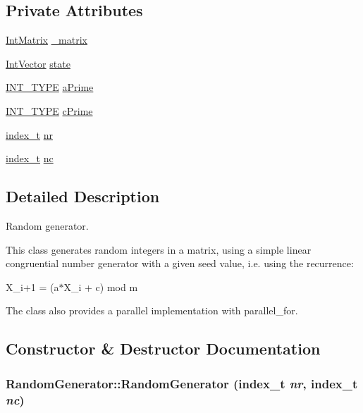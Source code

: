 \subsection*{Private Attributes}
\begin{CompactItemize}
\item 
\hyperlink{cowichan_8hpp_82321152ddeeefe9c61350a42ed9e7af}{IntMatrix} \hyperlink{class_random_generator_9fb2b8631b95d10abb2f013319d37f3f}{\_\-matrix}
\item 
\hyperlink{cowichan_8hpp_9bab229b7d95f858be62c35cca6ff294}{IntVector} \hyperlink{class_random_generator_4423c35148a29e6ddd8e108a144db2ac}{state}
\item 
\hyperlink{cowichan_8hpp_c96945095fd0ce7186a1d00a89f77d2c}{INT\_\-TYPE} \hyperlink{class_random_generator_3f733ddf90320aace1be173bdc7381da}{aPrime}
\item 
\hyperlink{cowichan_8hpp_c96945095fd0ce7186a1d00a89f77d2c}{INT\_\-TYPE} \hyperlink{class_random_generator_990ae8409e5290b6e911b609fb61d8c8}{cPrime}
\item 
\hyperlink{cowichan_8hpp_5b04577d5d21124855deaad298595371}{index\_\-t} \hyperlink{class_random_generator_ccc3239cc9aa8571936ca78b0e82adde}{nr}
\item 
\hyperlink{cowichan_8hpp_5b04577d5d21124855deaad298595371}{index\_\-t} \hyperlink{class_random_generator_b2273a84d69579c9e9e89d0073ced26c}{nc}
\end{CompactItemize}


\subsection{Detailed Description}
Random generator. 

This class generates random integers in a matrix, using a simple linear congruential number generator with a given seed value, i.e. using the recurrence:

X\_\-i+1 = (a$\ast$X\_\-i + c) mod m

The class also provides a parallel implementation with parallel\_\-for. 

\subsection{Constructor \& Destructor Documentation}
\hypertarget{class_random_generator_96274661438a80cfee1e7a33bc59f770}{
\subsubsection[{RandomGenerator}]{\setlength{\rightskip}{0pt plus 5cm}RandomGenerator::RandomGenerator ({\bf index\_\-t} {\em nr}, \/  {\bf index\_\-t} {\em nc})}}
\label{class_random_generator_96274661438a80cfee1e7a33bc59f770}


